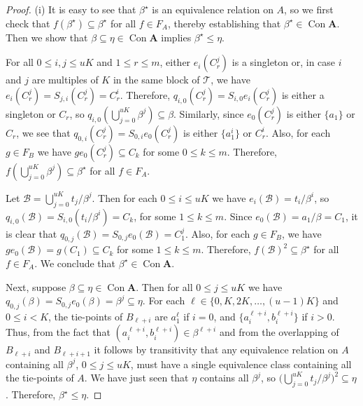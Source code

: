 \documentclass{au}
\numberwithin{equation}{section}
\theoremstyle{plain}
\theoremstyle{definition}
\newcommand{\defeq}{\ensuremath{=}}        %
\newcommand{\betai}{\ensuremath{\beta^i}}  %
\newcommand{\betaj}{\ensuremath{\beta^j}}  %
\newcommand{\<}{\ensuremath{\langle}}
\renewcommand{\>}{\ensuremath{\rangle}}
\newcommand{\bA}{\ensuremath{\mathbf{A}}}
\newcommand{\bB}{\ensuremath{\mathbf{B}}}
\newcommand{\sB}{\ensuremath{\mathcal{B}}}
\newcommand{\sT}{\ensuremath{\mathscr{T}}}
\DeclareMathOperator{\Con}{Con}
\renewcommand{\leq}{\ensuremath{\leqslant}}
\begin{document}
\begin{proof}
 (i) It is easy to see that $\beta^\star$ is an equivalence relation on $A$, so we first
  check that $f(\beta^\star)\subseteq \beta^\star$ for all $f\in F_A$, thereby
  establishing that $\beta^\star\in \Con\bA$. Then we show that
  $\beta \subseteq \eta \in \Con\bA$ implies $\beta^\star\leq \eta$.

For all $0\leq i,j \leq uK$ and $1\leq r \leq m$, either $e_i(C_r^j)$ is a
singleton or, in case $i$ and $j$ are multiples of $K$ in the same
block of $\sT$, we have
$e_i(C_r^j) = S_{j,i}(C_r^j) = C_r^i$.  Therefore,
$q_{i,0}(C_r^j) =S_{i,0}e_i(C_r^j)$ is
either a singleton or $C_r$, so
$q_{i,0}(\bigcup_{j=0}^{uK}\beta^j) \subseteq \beta$.
Similarly, since $e_0(C_r^j)$ is either $\{a_1\}$ or $C_r$, we see that
$q_{0,i}(C_r^j) = S_{0,i}e_0(C_r^j)$ is either $\{a_1^i\}$ or $C_r^i$. Also, for each $g\in F_B$
we have $ge_0(C_r^j)\subseteq C_k$ for some $0\leq k\leq m$.
Therefore, $f(\bigcup_{j=0}^{uK}\beta^j)\subseteq \beta^{\star}$ for all $f\in F_A$.

Let $\sB \defeq  \bigcup_{j=0}^{uK}t_j/\betaj$.
Then for each $0\leq i \leq uK$ we have $e_i(\sB) = t_i/\betai$, so
$q_{i,0}(\sB) = S_{i,0}(t_i/\betai) = C_k$, for some $1\leq k \leq m$.
Since $e_0(\sB) = a_1/\beta = C_1$, it is clear that $q_{0,j}(\sB) = S_{0,j}e_0(\sB) =
C_1^j$.  Also, for each $g\in F_B$, we have $g e_0(\sB) = g(C_1) \subseteq C_k$
for some $1\leq k\leq m$.  Therefore, $f(\sB)^2 \subseteq \beta^\star$ for all
$f\in F_A$.  We conclude that $\beta^\star \in \Con \bA$.

Next, suppose $\beta\subseteq \eta \in \Con \bA$.  Then for all $0\leq j \leq
uK$ we have $q_{0,j}(\beta) = S_{0,j}e_0(\beta) = \beta^j \subseteq \eta$.
For each
$\ell \in \{0, K, 2K, \dots, (u-1)K\}$ and $0\leq i <K$, the tie-points of
$B_{\ell+i}$ are $a_1^\ell$ if $i=0$, and $\{a_i^{\ell+i}, b_i^{\ell+i}\}$ if
$i>0$.  Thus, from the fact that $(a_i^{\ell+i}, b_i^{\ell+i})\in
\beta^{\ell+i}$ and from the overlapping of $B_{\ell+i}$ and
$B_{\ell+i+1}$ it follows
by transitivity that any equivalence relation on $A$ containing all $\beta^j$, $0\leq
j \leq uK$, must have a single equivalence class containing all the tie-points of $A$.
We have just seen that $\eta$ contains all $\beta^j$, so
$\bigl(\bigcup_{j=0}^{uK}t_j/\betaj\bigr)^2\subseteq \eta$.
Therefore, $\beta^\star \leq \eta$.


\end{proof}
\end{document}
